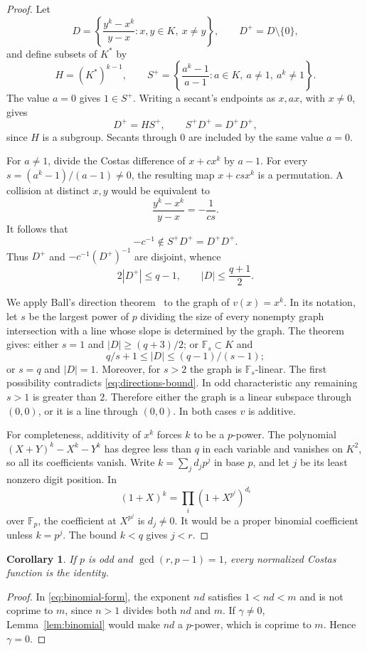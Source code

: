 \documentclass[11pt]{article}
\newtheorem{corollary}[theorem]{Corollary}
\theoremstyle{definition}
\theoremstyle{remark}
\newcommand{\Fp}{\mathbb F_p}
\numberwithin{equation}{section}
\begin{document}
\begin{proof}
Let
\[
 D=\left\{\frac{y^k-x^k}{y-x}:x,y\in K,\ x\ne y\right\},
 \qquad D^+=D\setminus\{0\},
\]
and define subsets of \(K^*\) by
\[
 H=(K^*)^{k-1},\qquad
 S^+=\left\{\frac{a^k-1}{a-1}:
                   a\in K,\ a\ne1,\ a^k\ne1\right\}.
\]
The value \(a=0\) gives \(1\in S^+\).
Writing a secant's endpoints as \(x,ax\), with \(x\ne0\), gives
\[
 D^+=HS^+,\qquad S^+D^+=D^+D^+,
\]
since \(H\) is a subgroup. Secants through \(0\) are included by
the same value \(a=0\).

For \(a\ne1\), divide the Costas difference of \(x+cx^k\) by
\(a-1\). For every \(s=(a^k-1)/(a-1)\ne0\), the resulting map
\(x+csx^k\) is a permutation. A collision at distinct \(x,y\)
would be equivalent to
\[
 \frac{y^k-x^k}{y-x}=-\frac1{cs}.
\]
It follows that
\[
 -c^{-1}\notin S^+D^+=D^+D^+.
\]
Thus \(D^+\) and \(-c^{-1}(D^+)^{-1}\) are disjoint, whence
\begin{equation}\label{eq:directions-bound}
 2|D^+|\le q-1,\qquad |D|\le\frac{q+1}{2}.
\end{equation}

We apply Ball's direction theorem~\cite[Theorem~1.1]{Ball} to
the graph of \(v(x)=x^k\).
In its notation, let \(s\) be the largest power of \(p\) dividing
the size of every nonempty graph intersection with a line whose slope
is determined by the graph. The theorem gives: either \(s=1\) and
\(|D|\ge(q+3)/2\); or \(\mathbb F_s\subset K\) and
\[
 q/s+1\le |D|\le(q-1)/(s-1);
\]
or \(s=q\) and \(|D|=1\). Moreover, for \(s>2\) the graph is
\(\mathbb F_s\)-linear. The first possibility contradicts
\eqref{eq:directions-bound}. In odd characteristic any remaining
\(s>1\) is greater than \(2\). Therefore either the graph is a
linear subspace through \((0,0)\), or it is a line through \((0,0)\).
In both cases \(v\) is additive.

For completeness, additivity of \(x^k\) forces \(k\) to be a
\(p\)-power. The polynomial
\((X+Y)^k-X^k-Y^k\) has degree less than \(q\) in each variable
and vanishes on \(K^2\), so all its coefficients vanish.
Write \(k=\sum_j d_jp^j\) in base \(p\), and let \(j\) be its
least nonzero digit position. In
\[
 (1+X)^k=\prod_i(1+X^{p^i})^{d_i}
\]
over \(\Fp\), the coefficient at \(X^{p^j}\) is \(d_j\ne0\).
It would be a proper binomial coefficient unless \(k=p^j\).
The bound \(k<q\) gives \(j<r\).
\end{proof}

\begin{corollary}\label{cor:coprime-case}
If \(p\) is odd and \(\gcd(r,p-1)=1\), every normalized Costas
function is the identity.
\end{corollary}
\begin{proof}
In \eqref{eq:binomial-form}, the exponent \(nd\) satisfies
\(1<nd<m\) and is not coprime to \(m\), since \(n>1\) divides
both \(nd\) and \(m\). If \(\gamma\ne0\),
Lemma~\ref{lem:binomial} would make \(nd\) a \(p\)-power,
which is coprime to \(m\). Hence \(\gamma=0\).
\end{proof}
\end{document}
